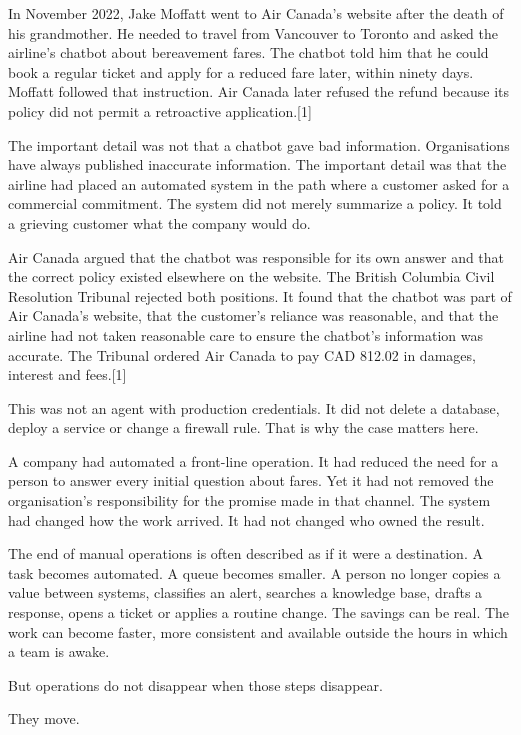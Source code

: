 In November 2022, Jake Moffatt went to Air Canada's website after the
death of his grandmother. He needed to travel from Vancouver to Toronto
and asked the airline's chatbot about bereavement fares. The chatbot
told him that he could book a regular ticket and apply for a reduced
fare later, within ninety days. Moffatt followed that instruction. Air
Canada later refused the refund because its policy did not permit a
retroactive application.{[}1{]}

The important detail was not that a chatbot gave bad information.
Organisations have always published inaccurate information. The
important detail was that the airline had placed an automated system in
the path where a customer asked for a commercial commitment. The system
did not merely summarize a policy. It told a grieving customer what the
company would do.

Air Canada argued that the chatbot was responsible for its own answer
and that the correct policy existed elsewhere on the website. The
British Columbia Civil Resolution Tribunal rejected both positions. It
found that the chatbot was part of Air Canada's website, that the
customer's reliance was reasonable, and that the airline had not taken
reasonable care to ensure the chatbot's information was accurate. The
Tribunal ordered Air Canada to pay CAD 812.02 in damages, interest and
fees.{[}1{]}

This was not an agent with production credentials. It did not delete a
database, deploy a service or change a firewall rule. That is why the
case matters here.

A company had automated a front-line operation. It had reduced the need
for a person to answer every initial question about fares. Yet it had
not removed the organisation's responsibility for the promise made in
that channel. The system had changed how the work arrived. It had not
changed who owned the result.

The end of manual operations is often described as if it were a
destination. A task becomes automated. A queue becomes smaller. A person
no longer copies a value between systems, classifies an alert, searches
a knowledge base, drafts a response, opens a ticket or applies a routine
change. The savings can be real. The work can become faster, more
consistent and available outside the hours in which a team is awake.

But operations do not disappear when those steps disappear.

They move.

